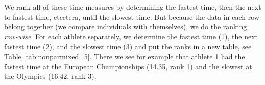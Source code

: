 \begin{kframe}


{\ttfamily\noindent\bfseries{}}\end{kframe}

We rank all of these time measures by determining the fastest time, then the next to fastest time, etcetera, until the slowest time. But because the data in each row belong together (we compare individuals with themselves), we do the ranking \textit{row-wise}. For each athlete separately, we determine the fastest time (1), the next fastest time (2), and the slowest time (3) and put the ranks in a new table, see Table \ref{tab:nonparmixed_5}. There we see for example that athlete 1 had the fastest time at the European Championships (14.35, rank 1) and the slowest at the Olympics (16.42, rank 3).


\begin{kframe}


{\ttfamily\noindent\bfseries\color{errorcolor}{\#\# Error in apply(datawide[, 2:4], 1, function(x) rank(x)): object 'datawide' not found}}

{\ttfamily\noindent\bfseries\color{errorcolor}{\#\# Error in eval(expr, envir, enclos): object 'datawide' not found}}

{\ttfamily\noindent\bfseries\color{errorcolor}{\#\# Error in t(ranks): object 'ranks' not found}}

{\ttfamily\noindent\bfseries{}}\end{kframe}



















